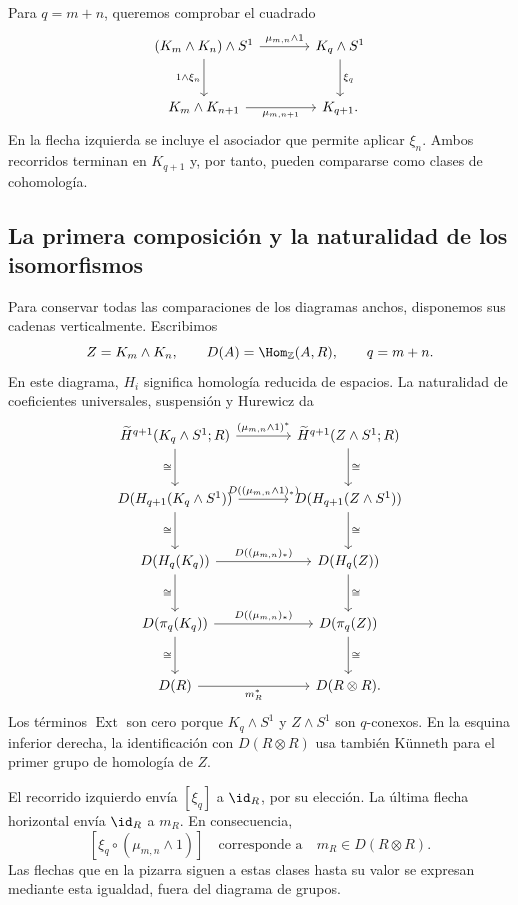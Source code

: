 Para $q=m+n$, queremos comprobar el cuadrado
\[
\begin{tikzcd}[column sep=large,row sep=large]
(K_m\wedge K_n)\wedge S^1\arrow[r,"\mu_{m,n}\wedge1"]\arrow[d,"1\wedge\xi_n"']&
K_q\wedge S^1\arrow[d,"\xi_q"]\\
K_m\wedge K_{n+1}\arrow[r,"\mu_{m,n+1}"']&K_{q+1}.
\end{tikzcd}
\]
En la flecha izquierda se incluye el asociador que permite aplicar $\xi_n$. Ambos recorridos terminan en $K_{q+1}$ y, por tanto, pueden compararse como clases de cohomología.

\subsection{La primera composición y la naturalidad de los isomorfismos}
Para conservar todas las comparaciones de los diagramas anchos, disponemos sus cadenas verticalmente. Escribimos
\[
Z=K_m\wedge K_n,
\qquad D(A)=\Hom_{\mathbb Z}(A,R),
\qquad q=m+n.
\]
En este diagrama, $H_i$ significa homología reducida de espacios. La naturalidad de coeficientes universales, suspensión y Hurewicz da
\[
\begin{tikzcd}[column sep=large,row sep=large]
\widetilde H^{q+1}(K_q\wedge S^1;R)
 \arrow[r,"(\mu_{m,n}\wedge1)^*"]\arrow[d,"\cong"']&
\widetilde H^{q+1}(Z\wedge S^1;R)\arrow[d,"\cong"]\\
D(H_{q+1}(K_q\wedge S^1))
 \arrow[r,"D((\mu_{m,n}\wedge1)_*)"]\arrow[d,"\cong"']&
D(H_{q+1}(Z\wedge S^1))\arrow[d,"\cong"]\\
D(H_q(K_q))\arrow[r,"D((\mu_{m,n})_*)"]\arrow[d,"\cong"']&
D(H_q(Z))\arrow[d,"\cong"]\\
D(\pi_q(K_q))\arrow[r,"D((\mu_{m,n})_*)"]\arrow[d,"\cong"']&
D(\pi_q(Z))\arrow[d,"\cong"]\\
D(R)\arrow[r,"m_R^*"']&D(R\otimes R).
\end{tikzcd}
\]
Los términos $\operatorname{Ext}$ son cero porque $K_q\wedge S^1$ y $Z\wedge S^1$ son $q$-conexos. En la esquina inferior derecha, la identificación con $D(R\otimes R)$ usa también Künneth para el primer grupo de homología de $Z$.

El recorrido izquierdo envía $[\xi_q]$ a $\id_R$, por su elección. La última flecha horizontal envía $\id_R$ a $m_R$. En consecuencia,
\[
[\xi_q\circ(\mu_{m,n}\wedge1)]
\quad\text{corresponde a}\quad m_R\in D(R\otimes R).
\]
Las flechas que en la pizarra siguen a estas clases hasta su valor se expresan mediante esta igualdad, fuera del diagrama de grupos.


